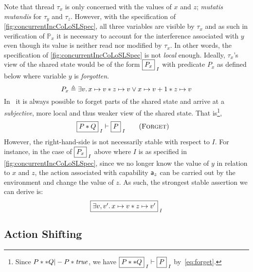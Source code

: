 Note that thread $\tau_x$ is only concerned with the values of $x$ and
$z$; \emph{mutatis mutandis} for $\tau_y$ and $\tau_z$. However, with
the specification of \fig\ref{fig:concurrentIncCoLoSLSpec}, all three
variables are visible by $\tau_x$ and as such in verification of
$\mathbb{P}_x$ it is necessary to account for the interference
associated with $y$ even though its value is neither read nor modified
by $\tau_x$. In other words, the specification of
\fig\ref{fig:concurrentIncCoLoSLSpec} is not \emph{local}
enough. Ideally, $\tau_x$'s view of the shared state would be of the form $\shared{P_x}{I}$ with predicate $P_x$ as defined below where variable $y$ is \emph{forgotten}.
\[
	P_x \mathrel{\triangleq} \exists v.\, x \mapsto v * z \mapsto v \lor x \mapsto v+1 * z \mapsto v
\]
In \colosl\ it is always possible to forget parts of the shared state
and arrive at a \emph{subjective}, more local and thus weaker view of
the shared state. That is\footnote{Since $P ** Q |- P * \mathit{true}$, we
  have $\shared{P ** Q}{I} \vdash \shared{P}{I}$ by~\eqref{eq:forget}.},
\begin{align*}
  \label{eq:forget}
  \shared{P * Q}{I} &\vdash \shared{P}{I}  \tag{\textsc{Forget}}
\end{align*}
However, the right-hand-side is not necessarily stable with respect to $I$. For instance, in the case of $\shared{P_x}{I}$ above where $I$ is as specified in \fig\ref{fig:concurrentIncCoLoSLSpec}, since we no longer know the value of $y$ in relation to $x$ and $z$, the action associated with capability $\mathsf{a}_z$ can be carried out by the environment and change the value of $z$. As such, the strongest stable assertion we can derive is: 
\[
	\shared{\exsts{v, v'}  \cell{x}{v} * \cell{z}{v'}}{I}
\]


\subsection{Action Shifting}
\label{subsec:shift}

